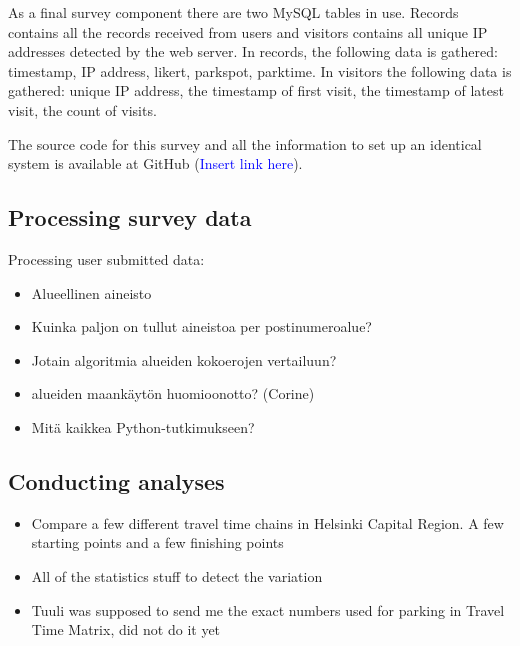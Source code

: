 As a final survey component there are two MySQL tables in use. Records contains all the records received from users and visitors contains all unique IP addresses detected by the web server. In records, the following data is gathered: timestamp, IP address, likert, parkspot, parktime. In visitors the following data is gathered: unique IP address, the timestamp of first visit, the timestamp of latest visit, the count of visits.

The source code for this survey and all the information to set up an identical system is available at GitHub (\textcolor{blue}{Insert link here}).

\subsection{Processing survey data}
\justify
Processing user submitted data:
\begin{itemize}
  \item Alueellinen aineisto
  \item Kuinka paljon on tullut aineistoa per postinumeroalue?
  \item Jotain algoritmia alueiden kokoerojen vertailuun?
  \item alueiden maankäytön huomioonotto? (Corine)
  \item Mitä kaikkea Python-tutkimukseen?
\end{itemize}

\subsection{Conducting analyses}
\justify
\begin{itemize}
  \item Compare a few different travel time chains in Helsinki Capital Region. A few starting points and a few finishing points
  \item All of the statistics stuff to detect the variation 
  \item Tuuli was supposed to send me the exact numbers used for parking in Travel Time Matrix, did not do it yet
\end{itemize}